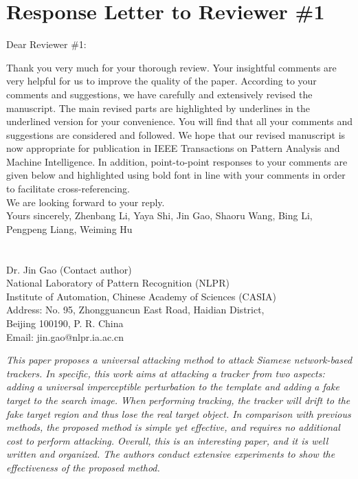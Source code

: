 \documentclass[12pt]{article}
\begin{document}
\newpage
{\centering\section*{Response Letter to Reviewer \#1}}
\noindent Dear Reviewer \#1:

Thank you very much for your thorough review. Your insightful comments are very helpful for us to improve the quality of the paper. According to your comments and suggestions, we have carefully and extensively revised the manuscript. The main revised parts are highlighted by underlines in the underlined version for your convenience. You will find that all your comments and suggestions are considered and followed. We hope that our revised manuscript is now appropriate for publication in IEEE Transactions on Pattern Analysis and Machine Intelligence.
In addition, point-to-point responses to your comments are given below and highlighted using bold font in line with your comments in order to facilitate cross-referencing.\\[10pt]
\indent We are looking forward to your reply.\\[10pt]
\noindent Yours sincerely,
\noindent Zhenbang Li, Yaya Shi, Jin Gao, Shaoru Wang, Bing Li, Pengpeng Liang, Weiming Hu
\\
\\
\\
\noindent Dr. Jin Gao (Contact author)\\
\noindent National Laboratory of Pattern Recognition (NLPR)\\
\noindent Institute of Automation, Chinese Academy of Sciences (CASIA)\\
\noindent Address: No. 95, Zhongguancun East Road, Haidian District,\\
\noindent Beijing 100190, P. R. China\\
\noindent Email: jin.gao@nlpr.ia.ac.cn

\newpage
\textit{This paper proposes a universal attacking method to attack Siamese network-based trackers. In specific, this work aims at attacking a tracker from two aspects: adding a universal imperceptible perturbation to the template and adding a fake target to the search image. When performing tracking, the tracker will drift to the fake target region and thus lose the real target object. In comparison with previous methods, the proposed method is simple yet effective, and requires no additional cost to perform attacking. Overall, this is an interesting paper, and it is well written and organized. The authors conduct extensive experiments to show the effectiveness of the proposed method.}
\end{document}
